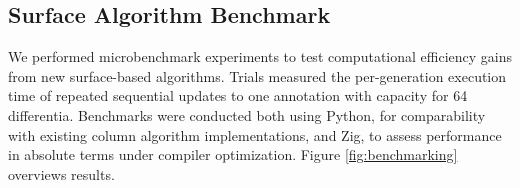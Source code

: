 

\subsection{Surface Algorithm Benchmark}



We performed microbenchmark experiments to test computational efficiency gains from new surface-based algorithms.
Trials measured the per-generation execution time of repeated sequential updates to one annotation with capacity for 64 differentia. %
Benchmarks were conducted both using Python, for comparability with existing column algorithm implementations, and Zig, to assess performance in absolute terms under compiler optimization.
Figure \ref{fig:benchmarking} overviews results.



